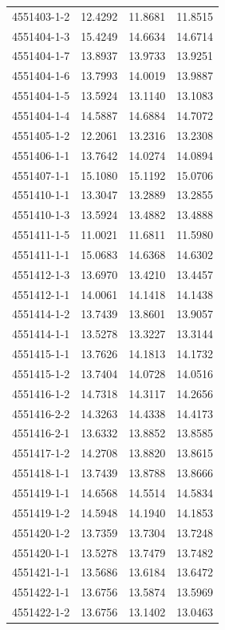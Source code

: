 \begin{longtable}{lrrr}
4551403-1-2 & 12.4292 & 11.8681 & 11.8515 \\
4551404-1-3 & 15.4249 & 14.6634 & 14.6714 \\
4551404-1-7 & 13.8937 & 13.9733 & 13.9251 \\
4551404-1-6 & 13.7993 & 14.0019 & 13.9887 \\
4551404-1-5 & 13.5924 & 13.1140 & 13.1083 \\
4551404-1-4 & 14.5887 & 14.6884 & 14.7072 \\
4551405-1-2 & 12.2061 & 13.2316 & 13.2308 \\
4551406-1-1 & 13.7642 & 14.0274 & 14.0894 \\
4551407-1-1 & 15.1080 & 15.1192 & 15.0706 \\
4551410-1-1 & 13.3047 & 13.2889 & 13.2855 \\
4551410-1-3 & 13.5924 & 13.4882 & 13.4888 \\
4551411-1-5 & 11.0021 & 11.6811 & 11.5980 \\
4551411-1-1 & 15.0683 & 14.6368 & 14.6302 \\
4551412-1-3 & 13.6970 & 13.4210 & 13.4457 \\
4551412-1-1 & 14.0061 & 14.1418 & 14.1438 \\
4551414-1-2 & 13.7439 & 13.8601 & 13.9057 \\
4551414-1-1 & 13.5278 & 13.3227 & 13.3144 \\
4551415-1-1 & 13.7626 & 14.1813 & 14.1732 \\
4551415-1-2 & 13.7404 & 14.0728 & 14.0516 \\
4551416-1-2 & 14.7318 & 14.3117 & 14.2656 \\
4551416-2-2 & 14.3263 & 14.4338 & 14.4173 \\
4551416-2-1 & 13.6332 & 13.8852 & 13.8585 \\
4551417-1-2 & 14.2708 & 13.8820 & 13.8615 \\
4551418-1-1 & 13.7439 & 13.8788 & 13.8666 \\
4551419-1-1 & 14.6568 & 14.5514 & 14.5834 \\
4551419-1-2 & 14.5948 & 14.1940 & 14.1853 \\
4551420-1-2 & 13.7359 & 13.7304 & 13.7248 \\
4551420-1-1 & 13.5278 & 13.7479 & 13.7482 \\
4551421-1-1 & 13.5686 & 13.6184 & 13.6472 \\
4551422-1-1 & 13.6756 & 13.5874 & 13.5969 \\
4551422-1-2 & 13.6756 & 13.1402 & 13.0463 \\

\end{longtable}
